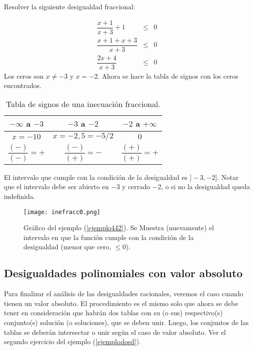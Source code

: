 \begin{myexample}
\label{ejemplo442}
Resolver la siguiente desigualdad fraccional:\\
\end{myexample}
	\begin{eqnarray}
\dfrac{x+1}{x+3}+1&\leq &0 \\
\dfrac{x+1+x+3}{x+3} &\leq &0 \\
\dfrac{2x+4}{x+3}& \leq & 0 
	\end{eqnarray} 
Los ceros son $x\neq-3$ y $x=-2$. Ahora se hace la tabla de signos con los ceros encontrados.\\
	\begin{center}
		\begin{table}[h!]
\centering
			\begin{tabular}{|c|c|c|}
\hline
$-\infty$ a $-3$&$-3$ a $-2$& $-2$ a $+\infty$ \\
\hline
$x=-10$&$x=-2,5=-5/2$&$0$ \\
$\dfrac{(-)}{(-)}=+$&$\dfrac{(-)}{(+)}=-$&$\dfrac{(+)}{(+)}=+$ \\
\hline 
			\end{tabular}
\caption[Tabla de signos de una inecuación fraccional.]{Tabla de signos de una inecuación fraccional.}
		\end{table}
	\end{center}
El intervalo que cumple con la condición de la desigualdad es $]-3,-2]$. Notar que el intervalo debe ser abierto en $-3$ y cerrado $-2$, o si no la desigualdad queda indefinida.


\begin{center}
\begin{figure}[h!]
\centering
\texttt{[image: inefracc0.png]}\caption[Gráfico del ejemplo (\ref{ejemplo442}).]{Gráfico del ejemplo (\ref{ejemplo442}). Se Muestra (nuevamente) el intervalo en que la función cumple con la condición de la desigualdad (menor que cero, $\leq 0$).}
\end{figure}
\end{center}
\newpage
\subsection{Desigualdades polinomiales con valor absoluto}
Para finalizar el análisis de las desigualdades racionales, veremos el caso cuando tienen un valor absoluto. El procedimiento es el mismo solo que ahora se debe tener en consideración que habrán dos tablas con su (o sus) respectivo(s) conjunto(s) solución (o soluciones), que se deben unir. Luego, los conjuntos de las tablas se deberán intersectar o unir según el caso de valor absoluto. Ver el segundo ejercicio del ejemplo (\ref{ejemplodosd}).


